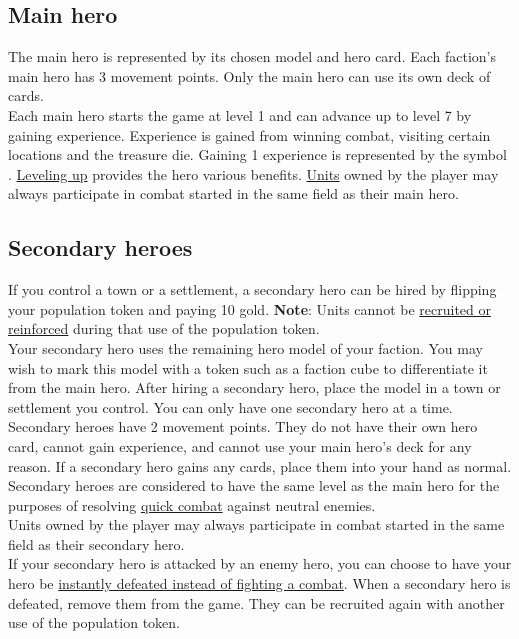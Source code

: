 \documentclass[12pt]{article}
\begin{document}
\subsection*{Main hero}
The main hero is represented by its chosen model and hero card. Each faction’s main hero has 3 movement points. Only the main hero can use its own deck of cards.\\[6pt]
Each main hero starts the game at level 1 and can advance up to level 7 by gaining experience. Experience is gained from winning combat, visiting certain locations and the treasure die. Gaining 1 experience is represented by the symbol . \hyperlink{Level}{Leveling up} provides the hero various benefits. \hyperlink{Units}{Units} owned by the player may always participate in combat started in the same field as their main hero.
\subsection*{\hypertarget{Secondary}{Secondary heroes}}
If you control a town or a settlement, a secondary hero can be hired by flipping your population token and paying 10 gold. \textbf{Note}: Units cannot be \hyperlink{Units}{recruited or reinforced} during that use of the population token.\\[6pt]
Your secondary hero uses the remaining hero model of your faction. You may wish to mark this model with a token such as a faction cube to differentiate it from the main hero. After hiring a secondary hero, place the model in a town or settlement you control. You can only have one secondary hero at a time.\\[6pt]
Secondary heroes have 2 movement points. They do not have their own hero card, cannot gain experience, and cannot use your main hero's deck for any reason. If a secondary hero gains any cards, place them into your hand as normal.
Secondary heroes are considered to have the same level as the main hero for the purposes of resolving \hyperlink{Quick}{quick combat} against neutral enemies.\\[6pt]
Units owned by the player may always participate in combat started in the same field as their secondary hero.\\[6pt]
If your secondary hero is attacked by an enemy hero, you can choose to have your hero be \hyperlink{Endcombat}{instantly defeated instead of fighting a combat}. When a secondary hero is defeated, remove them from the game. They can be recruited again with another use of the population token.\\[6pt]
\end{document}
